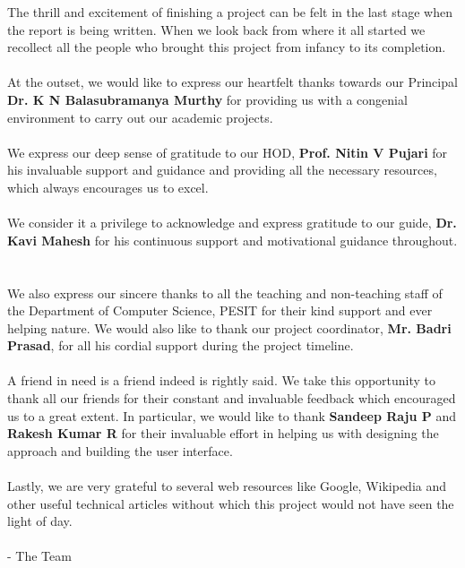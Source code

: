 \documentclass{report}
\begin{document}
\begin{coverpage}
\end{coverpage}

\begin{certificate}
\end{certificate}

\begin{acknowledgement}
The thrill and excitement of finishing a project can be felt in the last stage when the report is being written. When we look back from where it all started we recollect all the people who brought this project from infancy to its completion.
~\\\\
At the outset, we would like to express our heartfelt thanks towards our Principal \textbf{Dr. K N Balasubramanya Murthy} for providing us with a congenial environment to carry out our academic projects.
~\\\\
We express our deep sense of gratitude to our HOD, \textbf{Prof. Nitin V Pujari} for his invaluable support and guidance and providing all the necessary resources, which always encourages us to excel.
~\\\\
We consider it a privilege to acknowledge and express gratitude to our guide, \textbf{Dr. Kavi Mahesh} for his continuous support and motivational guidance throughout.
~\\\\
We also express our sincere thanks to all the teaching and non-teaching staff of the Department of Computer Science, PESIT for their kind support and ever helping nature. We would also like to thank our project coordinator, \textbf{Mr. Badri Prasad}, for all his cordial support during the project timeline.
~\\\\
A friend in need is a friend indeed is rightly said. We take this opportunity to thank all our friends for their constant and invaluable feedback which encouraged us to a great extent. In particular, we would like to thank \textbf{Sandeep Raju P} and \textbf{Rakesh Kumar R} for their invaluable effort in helping us with designing the approach and building the user interface.
~\\\\
Lastly, we are very grateful to several web resources like Google, Wikipedia and other useful technical articles without which this project would not have seen the light of day.
~\\\\
- The Team
\end{acknowledgement}
\end{document}
